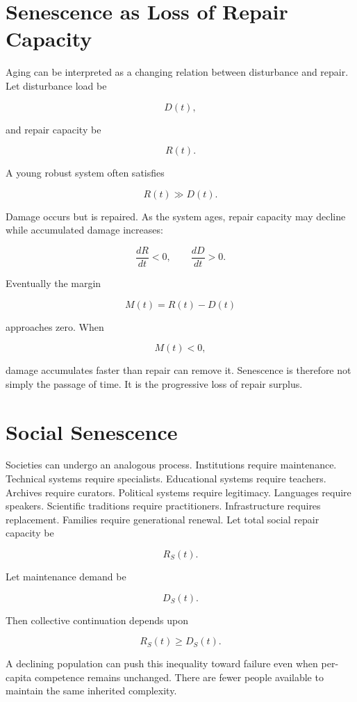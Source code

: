 \documentclass[11pt,oneside]{book}
\theoremstyle{definition}
\theoremstyle{remark}
\begin{document}
\section{Senescence as Loss of Repair Capacity}

Aging can be interpreted as a changing relation between disturbance and repair. Let disturbance load
be

\[
D(t),
\]

and repair capacity be

\[
R(t).
\]

A young robust system often satisfies

\[
R(t)\gg D(t).
\]

Damage occurs but is repaired. As the system ages, repair capacity may decline while accumulated
damage increases:

\[
\frac{dR}{dt}<0, \qquad \frac{dD}{dt}>0.
\]

Eventually the margin

\[
M(t)=R(t)-D(t)
\]

approaches zero. When

\[
M(t)<0,
\]

damage accumulates faster than repair can remove it. Senescence is therefore not simply the passage
of time. It is the progressive loss of repair surplus.

\section{Social Senescence}

Societies can undergo an analogous process. Institutions require maintenance. Technical systems
require specialists. Educational systems require teachers. Archives require curators. Political
systems require legitimacy. Languages require speakers. Scientific traditions require practitioners.
Infrastructure requires replacement. Families require generational renewal. Let total social repair
capacity be

\[
R_S(t).
\]

Let maintenance demand be

\[
D_S(t).
\]

Then collective continuation depends upon

\[
R_S(t)\geq D_S(t).
\]

A declining population can push this inequality toward failure even when per-capita competence
remains unchanged. There are fewer people available to maintain the same inherited complexity.
\end{document}
